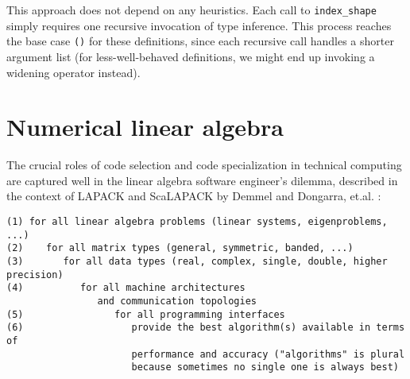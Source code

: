 This approach does not depend on any heuristics. Each call to \texttt{index\_shape}
simply requires one recursive invocation of type inference. This process reaches
the base case \texttt{()} for these definitions, since each recursive call
handles a shorter argument list (for less-well-behaved definitions, we might
end up invoking a widening operator instead).



\iffalse
\section{Array views}

tim holy in issue 8839:

``without staged functions in my initial post in 8235. The take-home message: generating all methods through dimension 8 resulted in more than 5000 separate methods, and required over 4 minutes of parsing \& lowering time (i.e., a 4-minute delay while compiling julia). By comparison, the stagedfunction implementation loads in a snap, and of course can go even beyond 8 dimensions.''
\fi

\section{Numerical linear algebra}
\label{sec:linalg}

The crucial roles of code selection and code specialization in technical
computing are captured well in the linear algebra software engineer's dilemma,
described in the context of LAPACK and ScaLAPACK by Demmel and Dongarra,
et.al. \cite{lawn181}:
\vspace{-3ex}
\begin{singlespace}
\begin{small}
\begin{verbatim}
(1) for all linear algebra problems (linear systems, eigenproblems, ...)
(2)    for all matrix types (general, symmetric, banded, ...)
(3)       for all data types (real, complex, single, double, higher precision)
(4)          for all machine architectures
                and communication topologies
(5)                for all programming interfaces
(6)                   provide the best algorithm(s) available in terms of
                      performance and accuracy ("algorithms" is plural
                      because sometimes no single one is always best)
\end{verbatim}
\end{small}
\end{singlespace}


